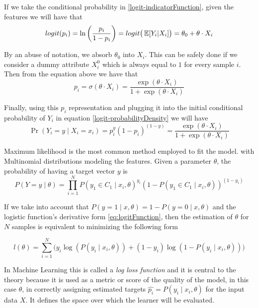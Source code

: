 If we take the conditional probability in \cref{logit-indicatorFunction}, given the features we will have that
\begin{equation}
logit(p_i)= \ln \left(\frac{p_i}{1-p_i} \right) = logit\big( \operatorname{\mathbb{E}}[Y_i| X_i] \big) = \theta_0 + \theta \cdot X_i
\end{equation}

By an abuse of notation, we absorb $\theta_0$ into $X_i$.
This can be safely done if we consider a dummy attribute $X_i^0$ which is always equal to $1$ for every sample $i$.
Then from the equation above we have that
\begin{equation}
p_i = \sigma(\theta \cdot X_i) = \frac{\exp(\theta \cdot X_i) }{1 + \exp(\theta \cdot X_i)}
\end{equation}

Finally, using this $p_i$ representation and plugging it into the initial conditional probability of $Y_i$ in equation \cref{logit-probabilityDensity} we will have
\begin{equation}
 \Pr(Y_i=y \mid X_i = x_i) = p_i^{y} {(1-p_i)}^{(1-y)} = \frac{\exp(\theta \cdot X_i) }{1 + \exp(\theta \cdot X_i)}
 \end{equation}


Maximum likelihood is the most common method employed to fit the model.
with Multinomial distributions modeling the features.
Given a parameter $\theta$, the probability of having a target vector $y$ is
\begin{equation}
P(Y =y \mid \theta ) = \prod_{i=1}^N {P(y_1 \in C_1 \mid x_i, \theta)}^{y_i} {(1 - P(y_1 \in C_1 \mid x_i, \theta) )}^{(1-y_i)}
\end{equation}

If we take into account that $P(y=1 \mid x,\theta) = 1 - P(y=0 \mid x,\theta)$ and the logistic function's derivative form \cref{eq:logitFunction}, then the estimation of $\theta$ for $N$ samples is equivalent to minimizing the following form

\begin{equation}
l(\theta) = \sum_{i=1}^N \big(y_i \log(P(y_i \mid x_i,\theta)) + (1-y_i)\log(1 - P(y_i \mid x_i,\theta) ) \big)
\label{eq:logLossFunction}
\end{equation}

In Machine Learning this is called a \emph{log loss function} and it is central to the theory because it is used as a metric or score of the quality of the model, in this case $\theta$, in correctly assigning estimated targets $ {\hat{p_i}} = P(y_i \mid x_i,\theta)$ for the input data $X$.
It defines the space over which the learner will be evaluated.

